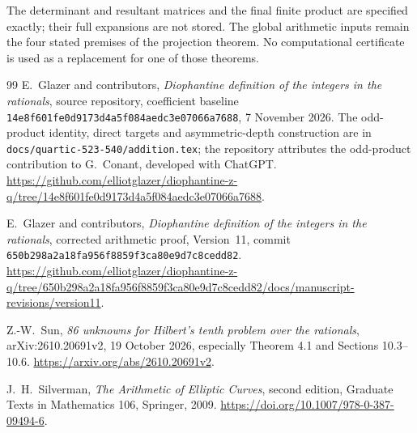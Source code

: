 \documentclass[11pt,a4paper]{article}
\theoremstyle{definition}
\theoremstyle{remark}
\begin{document}
The determinant and resultant matrices and the final finite product
are specified exactly; their full expansions are not stored. The
global arithmetic inputs remain the four stated premises of the
projection theorem. No computational certificate is used as a
replacement for one of those theorems.
\begin{thebibliography}{99}
\small
{}
E.~Glazer and contributors, \emph{Diophantine definition of the integers
in the rationals}, source repository, coefficient baseline
\texttt{14e8f601fe0d9173d4a5f084aedc3e07066a7688}, 7 November 2026.
The odd-product identity, direct targets and asymmetric-depth
construction are in \texttt{docs/quartic-523-540/addition.tex}; the
repository attributes the odd-product contribution to G.~Conant,
developed with ChatGPT.
\url{https://github.com/elliotglazer/diophantine-z-q/tree/14e8f601fe0d9173d4a5f084aedc3e07066a7688}.


E.~Glazer and contributors, \emph{Diophantine definition of the integers
in the rationals}, corrected arithmetic proof, Version~11,
commit \texttt{650b298a2a18fa956f8859f3ca80e9d7c8cedd82}.
\url{https://github.com/elliotglazer/diophantine-z-q/tree/650b298a2a18fa956f8859f3ca80e9d7c8cedd82/docs/manuscript-revisions/version11}.

Z.-W.~Sun, \emph{86 unknowns for Hilbert's tenth problem over
the rationals}, arXiv:2610.20691v2, 19 October 2026,
especially Theorem 4.1 and Sections 10.3--10.6.
\url{https://arxiv.org/abs/2610.20691v2}.


J.~H.~Silverman, \emph{The Arithmetic of Elliptic Curves},
second edition, Graduate Texts in Mathematics 106, Springer, 2009.
\url{https://doi.org/10.1007/978-0-387-09494-6}.


\end{thebibliography}
\end{document}
